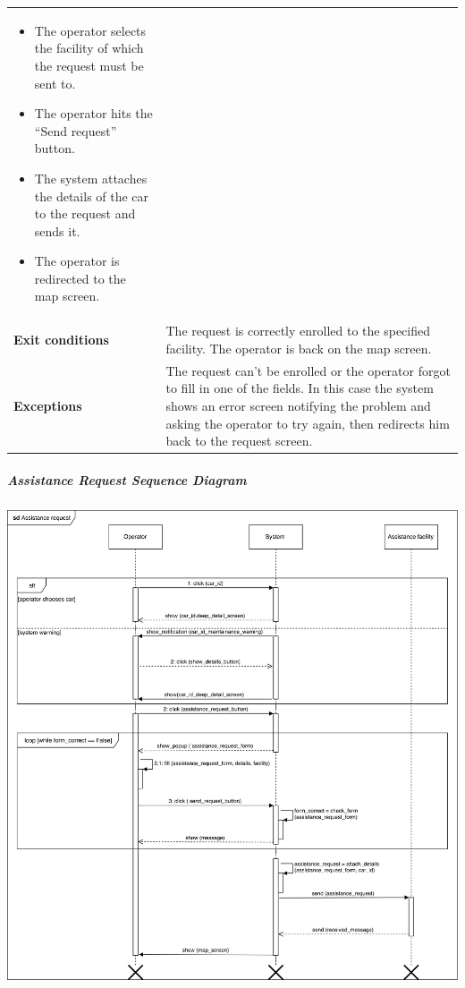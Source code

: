 \documentclass[]{article}
\let\oldsubparagraph\subparagraph
\renewcommand{\subparagraph}[1]{\oldsubparagraph{#1}\mbox{}}
\begin{document}
\begin{longtable}[]{@{}ll@{}}
\begin{minipage}[t]{0.65\columnwidth}
\begin{itemize}
\item
  The operator selects the facility of which the request must be sent
  to.
\item
  The operator hits the ``Send request'' button.
\item
  The system attaches the details of the car to the request and sends
  it.
\item
  The operator is redirected to the map screen.
\end{itemize}\strut
\end{minipage}\tabularnewline
\begin{minipage}[t]{0.29\columnwidth}\raggedright\strut
\textbf{Exit conditions}\strut
\end{minipage} & \begin{minipage}[t]{0.65\columnwidth}\raggedright\strut
The request is correctly enrolled to the specified facility. The
operator is back on the map screen.\strut
\end{minipage}\tabularnewline
\begin{minipage}[t]{0.29\columnwidth}\raggedright\strut
\textbf{Exceptions}\strut
\end{minipage} & \begin{minipage}[t]{0.65\columnwidth}\raggedright\strut
The request can't be enrolled or the operator forgot to fill in one of
the fields. In this case the system shows an error screen notifying the
problem and asking the operator to try again, then redirects him back to
the request screen.\strut
\end{minipage}\tabularnewline
\bottomrule
\end{longtable}

\newpage

\subparagraph{Assistance Request Sequence
Diagram}\label{assistance-request-sequence-diagram}

\centerline{\includegraphics[width=6.25000in]{./FlowDiagrams/AssistanceRequestSD.png}}\newpage
\end{document}

